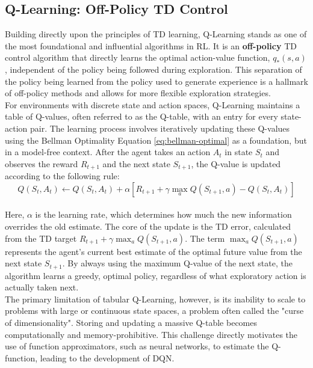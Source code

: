 \subsection{Q-Learning: Off-Policy TD Control}
\label{sec:q_learning}

\noindent
Building directly upon the principles of TD learning, Q-Learning stands as one of the most foundational and influential algorithms in RL. It is an \textbf{off-policy} TD control algorithm that directly learns the optimal action-value function, $q_*(s, a)$, independent of the policy being followed during exploration. This separation of the policy being learned from the policy used to generate experience is a hallmark of off-policy methods and allows for more flexible exploration strategies.
\\ \noindent
For environments with discrete state and action spaces, Q-Learning maintains a table of Q-values, often referred to as the Q-table, with an entry for every state-action pair. The learning process involves iteratively updating these Q-values using the Bellman Optimality Equation \ref{eq:bellman-optimal} as a foundation, but in a model-free context. After the agent takes an action $A_t$ in state $S_t$ and observes the reward $R_{t+1}$ and the next state $S_{t+1}$, the Q-value is updated according to the following rule:
\\ \noindent
\begin{equation}
    Q(S_t, A_t) \leftarrow Q(S_t, A_t) + \alpha \left[ R_{t+1} + \gamma \max_{a} Q(S_{t+1}, a) - Q(S_t, A_t) \right]
    \label{eq:q_learning_update}
\end{equation}
\\ \noindent
Here, $\alpha$ is the learning rate, which determines how much the new information overrides the old estimate. The core of the update is the TD error, calculated from the TD target $R_{t+1} + \gamma \max_{a} Q(S_{t+1}, a)$. The term $\max_{a} Q(S_{t+1}, a)$ represents the agent's current best estimate of the optimal future value from the next state $S_{t+1}$. By always using the maximum Q-value of the next state, the algorithm learns a greedy, optimal policy, regardless of what exploratory action is actually taken next.
\\ \noindent
The primary limitation of tabular Q-Learning, however, is its inability to scale to problems with large or continuous state spaces, a problem often called the "curse of dimensionality". Storing and updating a massive Q-table becomes computationally and memory-prohibitive. This challenge directly motivates the use of function approximators, such as neural networks, to estimate the Q-function, leading to the development of DQN.

